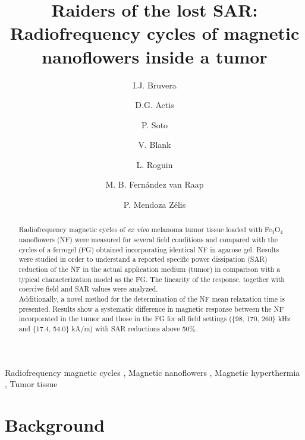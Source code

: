 \documentclass[preprint,12pt]{elsarticle}
\begin{document}
\begin{frontmatter}

\title{Raiders of the lost SAR: Radiofrequency cycles of magnetic nanoflowers inside a tumor}

\author[1]{I.J. Bruvera}

\author[1]{D.G. Actis}
\author[2]{P. Soto}
\author[2]{V. Blank}
\author[2]{L. Roguin}
\author[1]{M. B. Fernández van Raap}
\author[1]{P. Mendoza Z\'elis}
\address[1]{Instituto de Física La Plata (IFLP),UNLP-CONICET. Departamento de Física, Facultad de Ciencias Exactas, UNLP. La Plata, Argentina}
\address[2]{Instituto de Química y Físicoquímica Biológica (IQUIFIB), Departamento de Química Biológica, Facultad de Farmacia y Bíoquímica, UBA. CONICET, Buenos Aires, Argentina}


\begin{abstract}
Radiofrequency magnetic cycles of \textit{ex vivo} melanoma tumor tissue loaded with Fe$_3$O$_4$ nanoflowers (NF) were measured for several field conditions and compared with the cycles of a ferrogel (FG) obtained incorporating identical NF in agarose gel. Results were studied in order to understand a reported specific power dissipation (SAR) reduction of the NF in the actual application medium (tumor) in comparison with a typical characterization model as the FG. The linearity of the response, together with coercive field and SAR values were analyzed.\\ Additionally, a novel method for the determination of the NF mean relaxation time is presented.
Results show a systematic difference in magnetic response between the NF incorporated in the tumor and those in the FG for all field settings (\{98, 170, 260\} kHz and \{17.4, 54.0\} kA/m) with SAR reductions above 50\%.
\end{abstract}

\begin{keyword}
Radiofrequency magnetic cycles \sep
Magnetic nanoflowers \sep
Magnetic hyperthermia \sep
Tumor tissue
\end{keyword}

\end{frontmatter}

\section{Background}
\end{document}
